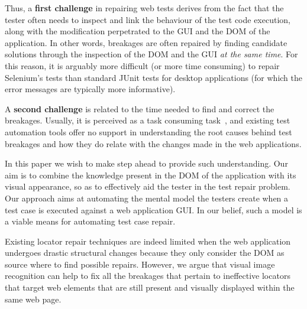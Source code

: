 Thus, a \textbf{first challenge} in repairing web tests derives from the fact that  
the tester often needs to inspect and link the behaviour of the test code execution, along with the modification perpetrated to the GUI and the DOM of the application. 
In other words, breakages are often repaired by finding candidate solutions through the inspection of the DOM and the GUI \textit{at the same time}.
For this reason, it is arguably more difficult (or more time consuming) to repair Selenium's tests than standard JUnit tests for desktop applications (for which the error messages are typically more informative).

A \textbf{second challenge} is related to the time needed to find and correct the breakages. Usually, it is perceived as a task consuming task~\cite{Leotta-TAIC-2013,JAMAICA2013}, and existing test automation tools offer no support in understanding the root causes behind test breakages and how they do relate with the changes made in the web applications. 

In this paper we wish to make step ahead to provide such understanding. 
Our aim is to combine the knowledge present in the DOM of the application with its visual appearance, so as to effectively aid the tester in the test repair problem. Our approach aims at automating the mental model the testers create when a test case is executed against a web application GUI. In our belief, such a model is a viable means for automating test case repair.

Existing locator repair techniques are indeed limited when the web application undergoes drastic structural changes because they only consider the DOM as source where to find possible repairs.
However, we argue that visual image recognition can help to fix all the breakages that pertain to ineffective locators that target web elements that are still present and visually displayed within the same web page.


